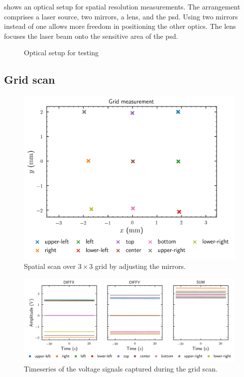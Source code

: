 shows an optical setup for spatial resolution measurements.
The arrangement comprises a laser source, two mirrors, a lens, and the \gls{psd}.
Using two mirrors instead of one allows more freedom in positioning the other optics.
The lens focuses the laser beam onto the sensitive area of the \gls{psd}.

\begin{figure}[htb]
	\centering
	
	\caption{Optical setup for testing}\label{fig:optical_setup}
\end{figure}

\subsection{Grid scan}

\begin{figure}[htb]
	\centering
	\includegraphics{figure/plot/grid-measurement}
	\caption{Spatial scan over $3\times 3$ grid by adjusting the mirrors.}\label{fig:grid_scan}
\end{figure}

\begin{figure}[htb]
	\centering
	\includegraphics[scale=0.7]{figure/plot/voltages}
	\caption{Timeseries of the voltage signals captured during the grid scan.}\label{fig:grid_scan_voltages}
\end{figure}

